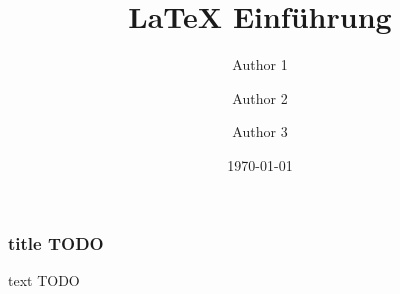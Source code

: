 \documentclass[]{beamer}
\title{\textbf{LaTeX Einführung}}
\author{Author 1 \and Author 2 \and Author 3}
\institute{Deutsche Schüler Akademie}
\date{\today}
\begin{document}
    \frame{\titelpage}

    
    \begin{frame}
        \frametitle{title TODO}
        text TODO
    \end{frame}
\end{document}

